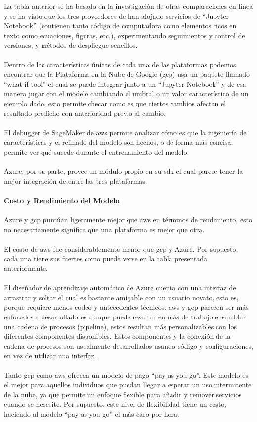 \documentclass[12pt, a4paper, titlepage]{report}
\begin{document}
		\newpage
			La tabla anterior se ha basado en la investigación de otras comparaciones en línea \cite{comparing-google-cloud-platform-aws-and-azure} y se ha visto que los tres proveedores de han alojado servicios de “Jupyter Notebook” (contienen tanto código de computadora como elementos ricos en texto como ecuaciones, figuras, etc.), experimentando seguimientos y control de versiones, y métodos de despliegue sencillos.\\
		\\
		Dentro de las características únicas de cada una de las plataformas podemos encontrar que la Plataforma en la Nube de Google (\acrshort{gcp}) usa un paquete llamado “what if tool” el cual se puede integrar junto a un “Jupyter Notebook” y de esa manera jugar con el modelo cambiando el umbral o un valor característico de un ejemplo dado, esto permite checar como es que ciertos cambios afectan el resultado predicho con anterioridad previo al cambio.\\
		\\
		El debugger de SageMaker de \acrshort{aws} permite analizar cómo es que la ingeniería de características y el refinado del modelo son hechos, o de forma más concisa, permite ver qué sucede durante el entrenamiento del modelo.\\
		\\
		Azure, por su parte, provee un módulo propio en su \acrshort{sdk} el cual parece tener la mejor integración de entre las tres plataformas.\\
		\\
		\textbf{Costo y Rendimiento del Modelo}\\
		\\
		Azure y \acrshort{gcp} puntúan ligeramente mejor que \acrshort{aws} en términos de rendimiento, esto no necesariamente significa que una plataforma es mejor que otra.\\
		\\
		El costo de \acrshort{aws} fue considerablemente menor que \acrshort{gcp} y Azure. Por supuesto, cada una tiene sus fuertes como puede verse en la tabla presentada anteriormente.\\
		\\
		El diseñador de aprendizaje automático de Azure cuenta con una interfaz de arrastrar y soltar el cual es bastante amigable con un usuario novato, esto es, porque requiere menos codeo y antecedentes técnicos. \acrshort{aws} y \acrshort{gcp} parecen ser más enfocados a desarrolladores aunque puede resultar en más de trabajo ensamblar una cadena de procesos (pipeline), estos resultan más personalizables con los diferentes componentes disponibles. Estos componentes y la conexión de la cadena de procesos son usualmente desarrollados usando código y configuraciones, en vez de utilizar una interfaz.\\
		\\
		Tanto \acrshort{gcp} como \acrshort{aws} ofrecen un modelo de pago “pay-as-you-go”. Este modelo es el mejor para aquellos individuos que puedan llegar a esperar un uso intermitente de la nube, ya que permite un enfoque flexible para añadir y remover servicios cuando se necesite. Por supuesto, este nivel de flexibilidad tiene un costo, haciendo al modelo “pay-as-you-go” el más caro por hora.
		
\end{document}

